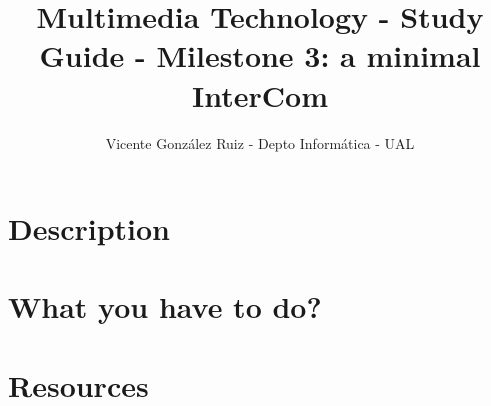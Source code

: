 \title{Multimedia Technology - Study Guide - Milestone 3: a minimal InterCom}
\author{Vicente González Ruiz - Depto Informática - UAL}

\section{Description}

\section{What you have to do?}

\section{Resources}
